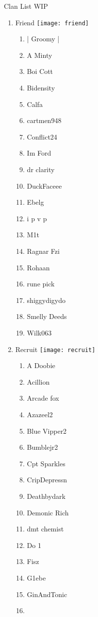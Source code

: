 \documentclass{article}
\begin{document}
Clan List WIP
\begin{enumerate}[I]
  \item 
    Friend \texttt{[image: friend]}
    \begin{enumerate}[I]
      \item
	| Groomy |
      \item
	A Minty
      \item
	Boi Cott
      \item
	Bidensity
      \item
	Calfa
      \item
	cartmen948
      \item
	Conflict24
      \item
	Im Ford
      \item
	dr clarity
      \item
	DuckFaceee
      \item
	Ebelg
      \item
	i p v p
      \item
	M1t
      \item
	Ragnar Fzi
      \item
	Rohaan
      \item
	rune pick
      \item
	shiggydigydo
      \item
	Smelly Deeds
      \item
	Wilk063
    \end{enumerate}
  \item
    Recruit \texttt{[image: recruit]}
    \begin{enumerate}[I]
      \item
	A Doobie
      \item 
	Acillion
      \item
	Arcade fox
      \item
	Azazeel2
      \item
	Blue Vipper2
      \item
	Bumblejr2
      \item
	Cpt Sparkles
      \item
	CripDepressn
      \item
	Deathbydark
      \item
	Demonic Rich
      \item
	dmt chemist
      \item
	Do 1
      \item
	Fisz
      \item
	G1ebe
      \item
	GinAndTonic
      \item

\end{enumerate}
\end{enumerate}
\end{document}
